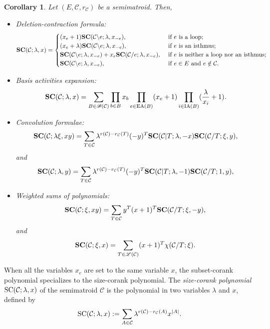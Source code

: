 \documentclass[12pt]{article}%
\renewcommand*{\bm}[1]{#1}%
\numberwithin{equation}{section}
\newtheorem{corollary}[corollary]{Corollary}
\begin{document}
\begin{corollary}\label{Pro-Subset-corank-Polynomial}
Let $(E,\mathcal{C},r_{\mathcal{C}})$ be a semimatroid. Then,
\begin{itemize}
\item[{\rm (1)}] Deletion-contraction formula:
\[
{\bf SC}(\mathcal{C};\lambda,\bm x)=
\begin{cases}
(x_e+1){\bf SC}(\mathcal{C}\backslash e;\lambda,\bm x_{-e}),&\text{ if } e \text{ is a loop};\\
(x_e+\lambda){\bf SC}(\mathcal{C}\backslash e;\lambda,\bm x_{-e}),&\text{ if } e \text{ is an isthmus};\\
{\bf SC}(\mathcal{C}\backslash e;\lambda,\bm x_{-e})+x_e{\bf SC}(\mathcal{C}/e;\lambda,\bm x_{-e}),&\text{ if } e \text{ is neither a loop nor an isthmus};\\
{\bf SC}(\mathcal{C}\backslash e;\lambda,\bm x_{-e}),&\text{ if } e\in E \text{ and } e\notin\mathcal{C}.
\end{cases}
\]
\item[{\rm (2)}] Basis activities expansion:
\[
{\bf SC}(\mathcal{C};\lambda,\bm x)=\sum_{B\in\mathscr{B}(\mathcal{C})}\prod_{b\in B}x_b\prod_{e\in {\rm EA}(B)}(x_e+1)\prod_{i\in {\rm IA}(B)}(\frac{\lambda}{x_i}+1).
\]
\item[{\rm (3)}] Convolution formulae:
\[
{\bf SC}(\mathcal{C};\lambda\xi,\bm {xy})=\sum_{T\in\mathcal{C}}\lambda^{r(\mathcal{C})-r_{\mathcal{C}}(T)}(-\bm y)^T{\bf SC}(\mathcal{C}|T;\lambda,-\bm x){\bf SC}(\mathcal{C}/T;\xi,\bm y),
\]
and
\[
{\bf SC}(\mathcal{C};\lambda,\bm y)=\sum_{T\in\mathcal{C}}\lambda^{r(\mathcal{C})-r_{\mathcal{C}}(T)}(-\bm y)^T{\bf SC}(\mathcal{C}|T;\lambda,-1){\bf SC}(\mathcal{C}/T;1,\bm y),
\]
\item[{\rm (4)}] Weighted sums of polynomials:
\[
{\bf SC}(\mathcal{C};\xi,\bm x\bm y)=\sum_{T\in\mathcal{C}}\bm y^T(\bm x+1)^T{\bf SC}(\mathcal{C}/T;\xi,-\bm y),
\]
and
\[
{\bf SC}(\mathcal{C};\xi,\bm x)=\sum_{T\in\mathscr{L}(\mathcal{C})}(\bm x+1)^T\chi(\mathcal{C}/T;\xi).
\]
\end{itemize}
\end{corollary}

When all the variables $x_e$ are set to the same variable $x$, the subset-corank polynomial specializes to the size-corank polynomial. 
The {\em size-corank polynomial }${\rm SC}(\mathcal{C};\lambda,x)$ of the semimatroid $\mathcal{C}$ is the polynomial in two variables $\lambda$ and $x$, defined by
\[
{\rm SC}(\mathcal{C};\lambda,x):=\sum_{A\in\mathcal{C}}\lambda^{r(\mathcal{C})-r_{\mathcal{C}}(A)}x^{|A|}.
\]
\end{document}

